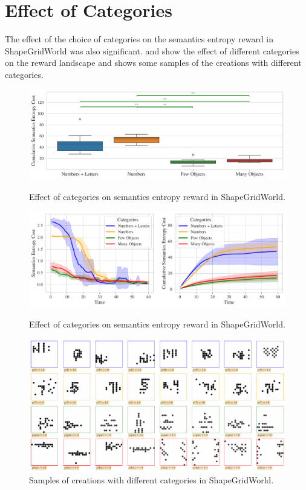 \section{Effect of Categories}
\label{sec:sgw-categories}
The effect of the choice of categories on the semantics entropy reward in ShapeGridWorld was also significant.
 and  show the effect of different categories on the reward landscape and  shows some samples of the creations with different categories.

\begin{figure}[H]
    \centering
    \includegraphics[width=\textwidth]{images/categories_boxplot_sgw_rair.pdf}
    \caption{Effect of categories on semantics entropy reward in ShapeGridWorld.}
    \label{fig:categories-boxplot-sgw}
    \includegraphics[width=\textwidth]{images/categories_comparison_sgw_rair.pdf}
    \caption{Effect of categories on semantics entropy reward in ShapeGridWorld.}
    \label{fig:categories-sgw}
    \includegraphics[width=\textwidth]{images/categories_samples_sgw_rair.pdf}
    \caption{Samples of creations with different categories in ShapeGridWorld.}
    \label{fig:categories-samples-sgw}
\end{figure}

